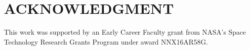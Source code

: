 \documentclass[letterpaper, 10 pt, conference]{ieeeconf}  %
\begin{document}
\section*{ACKNOWLEDGMENT}
This work was supported by an Early Career Faculty grant from NASA's Space Technology Research Grants Program under award NNX16AR58G.






\end{document}
